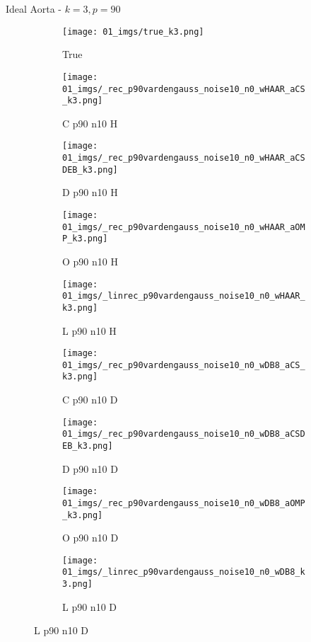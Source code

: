 \begin{frame}{Ideal Aorta - $k=3,p=90$}{}
\begin{figure}
\begin{subfigure}{0.1\textwidth}
\texttt{[image: 01\_imgs/true\_k3.png]}
\caption*{\Tiny True}
\end{subfigure}
\begin{subfigure}{0.1\textwidth}
\texttt{[image: 01\_imgs/\_rec\_p90vardengauss\_noise10\_n0\_wHAAR\_aCS\_k3.png]}
\caption*{\Tiny C p90 n10 H}
\end{subfigure}
\begin{subfigure}{0.1\textwidth}
\texttt{[image: 01\_imgs/\_rec\_p90vardengauss\_noise10\_n0\_wHAAR\_aCSDEB\_k3.png]}
\caption*{\Tiny D p90 n10 H}
\end{subfigure}
\begin{subfigure}{0.1\textwidth}
\texttt{[image: 01\_imgs/\_rec\_p90vardengauss\_noise10\_n0\_wHAAR\_aOMP\_k3.png]}
\caption*{\Tiny O p90 n10 H}
\end{subfigure}
\begin{subfigure}{0.1\textwidth}
\texttt{[image: 01\_imgs/\_linrec\_p90vardengauss\_noise10\_n0\_wHAAR\_k3.png]}
\caption*{\Tiny L p90 n10 H}
\end{subfigure}
\begin{subfigure}{0.1\textwidth}
\texttt{[image: 01\_imgs/\_rec\_p90vardengauss\_noise10\_n0\_wDB8\_aCS\_k3.png]}
\caption*{\Tiny C p90 n10 D}
\end{subfigure}
\begin{subfigure}{0.1\textwidth}
\texttt{[image: 01\_imgs/\_rec\_p90vardengauss\_noise10\_n0\_wDB8\_aCSDEB\_k3.png]}
\caption*{\Tiny D p90 n10 D}
\end{subfigure}
\begin{subfigure}{0.1\textwidth}
\texttt{[image: 01\_imgs/\_rec\_p90vardengauss\_noise10\_n0\_wDB8\_aOMP\_k3.png]}
\caption*{\Tiny O p90 n10 D}
\end{subfigure}
\begin{subfigure}{0.1\textwidth}
\texttt{[image: 01\_imgs/\_linrec\_p90vardengauss\_noise10\_n0\_wDB8\_k3.png]}
\caption*{\Tiny L p90 n10 D}
\end{subfigure}
\vspace{5pt}


\end{figure}
\end{frame}
